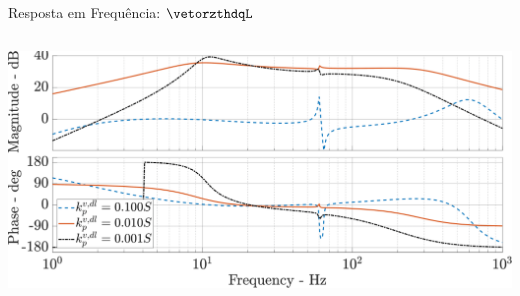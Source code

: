 \begin{frame}{Resposta em Frequência: $\vetorzthdqL$}
\begin{columns}
\includegraphics[width=0.88\linewidth]{./figuras/figuras_var_gain/bode_Zth_vdl_srf_dq_var_kpv}

\end{columns}



\end{frame}
